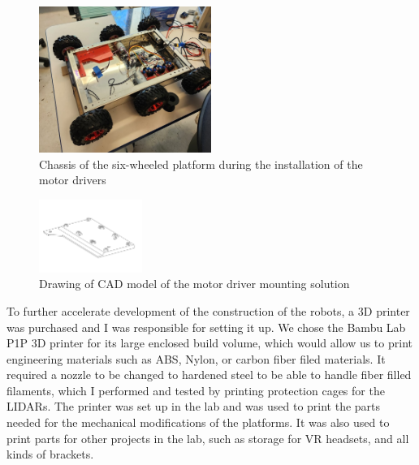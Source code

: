 \documentclass[12pt]{article}
\begin{document}
        \begin{figure}[H]
            \centering
            \includegraphics[width=0.5\textwidth]{Images/wheeled_platform_empty.jpg}
            \caption{Chassis of the six-wheeled platform during the installation of the motor drivers}
            \label{fig:wheeled_latform}
        \end{figure}


        \begin{figure}[H]
            \centering
            \includegraphics[width=0.3\textwidth]{Images/Motor_driver_holder.pdf}
            \caption{Drawing of CAD model of the motor driver mounting solution}
            \label{fig:motor_driver_mount}
        \end{figure}
        
        To further accelerate development of the construction of the robots, a 3D printer was purchased and I was responsible for setting it up. We chose the Bambu Lab P1P 3D printer for its large enclosed build volume, which would allow us to print engineering materials such as ABS, Nylon, or carbon fiber filed materials. It required a nozzle to be changed to hardened steel to be able to handle fiber filled filaments, which I performed and tested by printing protection cages for the LIDARs. The printer was set up in the lab and was used to print the parts needed for the mechanical modifications of the platforms. It was also used to print parts for other projects in the lab, such as storage for VR headsets, and all kinds of brackets.
\end{document}
